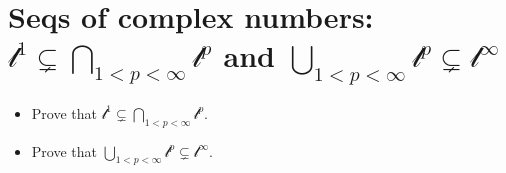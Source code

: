 \section{\texorpdfstring{Seqs of complex numbers: \(\mathcal{l}^{1} \subsetneq \bigcap_{1 < p < \infty}\mathcal{l}^{p}\) and \(\bigcup_{1 < p < \infty}\mathcal{l}^{p} \subsetneq \mathcal{l}^{\infty}\)}{Seqs of complex numbers: \textbackslash mathcal\{l\}\^{}\{1\} \textbackslash subsetneq \textbackslash bigcap\_\{1 \textless{} p \textless{} \textbackslash infty\}\textbackslash mathcal\{l\}\^{}\{p\} and \textbackslash bigcup\_\{1 \textless{} p \textless{} \textbackslash infty\}\textbackslash mathcal\{l\}\^{}\{p\} \textbackslash subsetneq \textbackslash mathcal\{l\}\^{}\{\textbackslash infty\}}}\label{seqs-of-complex-numbers-ell1subsetneqbigcap_1pinftyellp-and-bigcup_1pinftyellpsubsetneqellinfty}

\begin{itemize}
\item
  Prove that \(\mathcal{l}^{1} \subsetneq \bigcap_{1 < p < \infty}\mathcal{l}^{p}\).
\item
  Prove that \(\bigcup_{1 < p < \infty}\mathcal{l}^{p} \subsetneq \mathcal{l}^{\infty}\).
\end{itemize}

